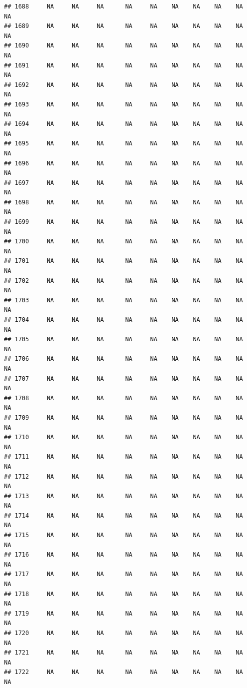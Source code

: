 \documentclass{article}\usepackage{graphicx, color}
\makeatletter
\newenvironment{kframe}{%
 \def\at@end@of@kframe{}%
 \ifinner\ifhmode%
  \def\at@end@of@kframe{\end{minipage}}%
  \begin{minipage}{\columnwidth}%
 \fi\fi%
 \def\FrameCommand##1{\hskip\@totalleftmargin \hskip-\fboxsep
 \colorbox{shadecolor}{##1}\hskip-\fboxsep
     \hskip-\linewidth \hskip-\@totalleftmargin \hskip\columnwidth}%
 \MakeFramed {\advance\hsize-\width
   \@totalleftmargin\z@ \linewidth\hsize
   \@setminipage}}%
 {\par\unskip\endMakeFramed%
 \at@end@of@kframe}
\newenvironment{knitrout}{}{} %
\makeatother
\begin{document}
\begin{knitrout}
\begin{kframe}
\begin{verbatim}
## 1688     NA     NA     NA      NA     NA    NA    NA    NA    NA     NA
## 1689     NA     NA     NA      NA     NA    NA    NA    NA    NA     NA
## 1690     NA     NA     NA      NA     NA    NA    NA    NA    NA     NA
## 1691     NA     NA     NA      NA     NA    NA    NA    NA    NA     NA
## 1692     NA     NA     NA      NA     NA    NA    NA    NA    NA     NA
## 1693     NA     NA     NA      NA     NA    NA    NA    NA    NA     NA
## 1694     NA     NA     NA      NA     NA    NA    NA    NA    NA     NA
## 1695     NA     NA     NA      NA     NA    NA    NA    NA    NA     NA
## 1696     NA     NA     NA      NA     NA    NA    NA    NA    NA     NA
## 1697     NA     NA     NA      NA     NA    NA    NA    NA    NA     NA
## 1698     NA     NA     NA      NA     NA    NA    NA    NA    NA     NA
## 1699     NA     NA     NA      NA     NA    NA    NA    NA    NA     NA
## 1700     NA     NA     NA      NA     NA    NA    NA    NA    NA     NA
## 1701     NA     NA     NA      NA     NA    NA    NA    NA    NA     NA
## 1702     NA     NA     NA      NA     NA    NA    NA    NA    NA     NA
## 1703     NA     NA     NA      NA     NA    NA    NA    NA    NA     NA
## 1704     NA     NA     NA      NA     NA    NA    NA    NA    NA     NA
## 1705     NA     NA     NA      NA     NA    NA    NA    NA    NA     NA
## 1706     NA     NA     NA      NA     NA    NA    NA    NA    NA     NA
## 1707     NA     NA     NA      NA     NA    NA    NA    NA    NA     NA
## 1708     NA     NA     NA      NA     NA    NA    NA    NA    NA     NA
## 1709     NA     NA     NA      NA     NA    NA    NA    NA    NA     NA
## 1710     NA     NA     NA      NA     NA    NA    NA    NA    NA     NA
## 1711     NA     NA     NA      NA     NA    NA    NA    NA    NA     NA
## 1712     NA     NA     NA      NA     NA    NA    NA    NA    NA     NA
## 1713     NA     NA     NA      NA     NA    NA    NA    NA    NA     NA
## 1714     NA     NA     NA      NA     NA    NA    NA    NA    NA     NA
## 1715     NA     NA     NA      NA     NA    NA    NA    NA    NA     NA
## 1716     NA     NA     NA      NA     NA    NA    NA    NA    NA     NA
## 1717     NA     NA     NA      NA     NA    NA    NA    NA    NA     NA
## 1718     NA     NA     NA      NA     NA    NA    NA    NA    NA     NA
## 1719     NA     NA     NA      NA     NA    NA    NA    NA    NA     NA
## 1720     NA     NA     NA      NA     NA    NA    NA    NA    NA     NA
## 1721     NA     NA     NA      NA     NA    NA    NA    NA    NA     NA
## 1722     NA     NA     NA      NA     NA    NA    NA    NA    NA     NA

\end{verbatim}
\end{kframe}
\end{knitrout}
\end{document}
